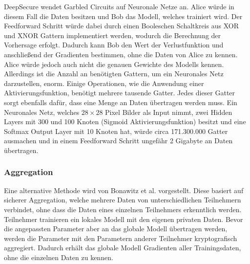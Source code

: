 DeepSecure wendet Garbled Circuits auf Neuronale Netze an.
Alice würde in diesem Fall die Daten besitzen und Bob das Modell, welches trainiert wird.
Der Feedforward Schritt würde dabei durch einen Booleschen Schaltkreis aus XOR und XNOR Gattern implementiert werden, wodurch die Berechnung der Vorhersage erfolgt.
Dadurch kann Bob den Wert der Verlustfunktion und anschließend der Gradienten bestimmen, ohne die Daten von Alice zu kennen.
Alice würde jedoch auch nicht die genauen Gewichte des Modells kennen.
Allerdings ist die Anzahl an benötigten Gattern, um ein Neuronales Netz darzustellen, enorm.
Einige Operationen, wie die Anwendung einer Aktivierungsfunktion, benötigt mehrere tausende Gatter.
Jedes dieser Gatter sorgt ebenfalls dafür, dass eine Menge an Daten übertragen werden muss.
Ein Neuronales Netz, welches $28\times28$ Pixel Bilder als Input nimmt, zwei Hidden Layers mit 300 und 100 Knoten (Sigmoid Aktivierungsfunktion) besitzt und eine Softmax Output Layer mit 10 Knoten hat, würde circa 171.300.000 Gatter ausmachen und in einem Feedforward Schritt ungefähr 2 Gigabyte an Daten übertragen.

\subsubsection*{Aggregation}
Eine alternative Methode wird von Bonawitz et al. \cite{P-36} vorgestellt.
Diese basiert auf sicherer Aggregation, welche mehrere Daten von unterschiedlichen Teilnehmern verbindet, ohne dass die Daten eines einzelnen Teilnehmers erkenntlich werden.
Teilnehmer trainieren ein lokales Modell mit den eigenen privaten Daten. 
Bevor die angepassten Parameter aber an das globale Modell übertragen werden, werden die Parameter mit den Parametern anderer Teilnehmer kryptografisch aggregiert.
Dadurch erhält das globale Modell Gradienten aller Trainingsdaten, ohne die einzelnen Daten zu kennen.

